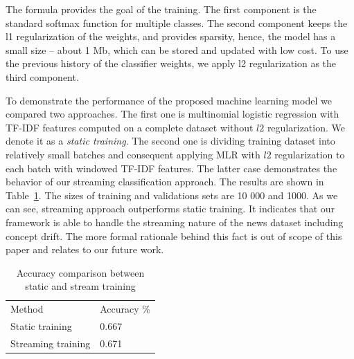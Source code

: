 The formula provides the goal of the training. The first component is the standard softmax function for multiple classes. The second component keeps the l1 regularization of the weights, and provides sparsity, hence, the model has a small size -- about 1 Mb, which can be stored and updated with low cost. To use the previous history of the classifier weights, we apply l2 regularization as the third component. 

To demonstrate the performance of the proposed machine learning model we compared two approaches. The first one is multinomial logistic regression with TF-IDF features computed on a complete dataset without $l2$ regularization. We denote it as a {\em static training}. The second one is dividing training dataset into relatively small batches and consequent applying MLR with $l2$ regularization to each batch with windowed TF-IDF features. The latter case demonstrates the behavior of our streaming classification approach. The results are shown in Table~\ref{accuracy}. The sizes of training and validations sets are 10 000 and 1000. As we can see, streaming approach outperforms static training. It indicates that our framework is able to handle the streaming nature of the news dataset including concept drift. The more formal rationale behind this fact is out of scope of this paper and relates to our future work.

\begin{table}[htbp]
\begin{tabular}{ll}
Method          & Accuracy \% \\
Static training  & 0.667          \\
Streaming training & 0.671         
\end{tabular}
\caption{Accuracy comparison between static and stream training}
\label{accuracy}
\vspace{-7mm}
\end{table}